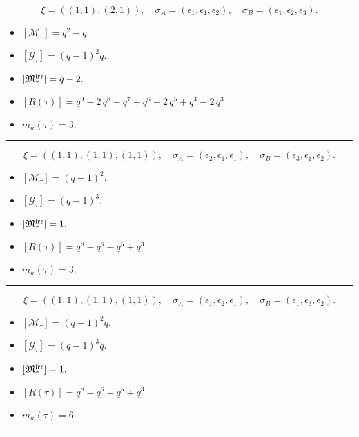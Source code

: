 \documentclass[10pt,a4paper]{amsart}
\begin{document}
$$\xi = ({(1, 1)}, {(2, 1)}),\quad \sigma_A = ({{\epsilon_1}}, {{\epsilon_1, \epsilon_2}}),\quad \sigma_B = ({{\epsilon_1}}, {{\epsilon_2, \epsilon_3}}).$$

\begin{itemize}
 \item $[\mathcal{M}_{\tau}] = q^{2} - q .$

 \item $[\mathcal{G}_{\tau}] = {\left(q - 1\right)}^{2} q .$

 \item $[{\frak M}_{\tau}^{\textrm{irr}}] = q - 2 .$

 \item $[R(\tau)] = q^{9} - 2 \, q^{8} - q^{7} + q^{6} + 2 \, q^{5} + q^{4} - 2 \, q^{3} $

 \item $m_{\kappa}(\tau) = 3 .$

 \end{itemize}
\noindent\rule{8cm}{0.4pt}

$$\xi = ({(1, 1)}, {(1, 1), (1, 1)}),\quad \sigma_A = ({{\epsilon_2}}, {{\epsilon_1}, {\epsilon_1}}),\quad \sigma_B = ({{\epsilon_3}}, {{\epsilon_1}, {\epsilon_2}}).$$

\begin{itemize}
 \item $[\mathcal{M}_{\tau}] = {\left(q - 1\right)}^{2} .$

 \item $[\mathcal{G}_{\tau}] = {\left(q - 1\right)}^{3} .$

 \item $[{\frak M}_{\tau}^{\textrm{irr}}] = 1 .$

 \item $[R(\tau)] = q^{8} - q^{6} - q^{5} + q^{3} $

 \item $m_{\kappa}(\tau) = 3 .$

 \end{itemize}
\noindent\rule{8cm}{0.4pt}

$$\xi = ({(1, 1)}, {(1, 1)}, {(1, 1)}),\quad \sigma_A = ({{\epsilon_1}}, {{\epsilon_2}}, {{\epsilon_1}}),\quad \sigma_B = ({{\epsilon_1}}, {{\epsilon_3}}, {{\epsilon_2}}).$$

\begin{itemize}
 \item $[\mathcal{M}_{\tau}] = {\left(q - 1\right)}^{2} q .$

 \item $[\mathcal{G}_{\tau}] = {\left(q - 1\right)}^{3} q .$

 \item $[{\frak M}_{\tau}^{\textrm{irr}}] = 1 .$

 \item $[R(\tau)] = q^{8} - q^{6} - q^{5} + q^{3} $

 \item $m_{\kappa}(\tau) = 6 .$

 \end{itemize}
\noindent\rule{9cm}{2pt}\vspace{0.2cm}
\end{document}
